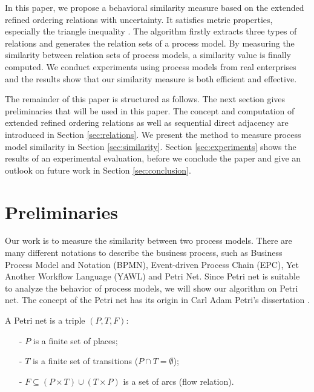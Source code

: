 \documentclass{llncs}
\begin{document}
In this paper, we propose a behavioral similarity measure based on the extended refined ordering relations with uncertainty. It satisfies metric properties, especially the triangle inequality \cite{zezula2006similarity}. The algorithm firstly extracts three types of relations and generates the relation sets of a process model. By measuring the similarity between relation sets of process models, a similarity value is finally computed. We conduct experiments using process models from real enterprises and the results show that our similarity measure is both efficient and effective.

The remainder of this paper is structured as follows. The next section gives preliminaries that will be used in this paper. The concept and computation of extended refined ordering relations as well as sequential direct adjacency are introduced in Section \ref{sec:relations}. We present the method to measure process model similarity in Section \ref{sec:similarity}. Section \ref{sec:experiments} shows the results of an experimental evaluation, before we conclude the paper and give an outlook on future work in Section \ref{sec:conclusion}.

\section{Preliminaries}\label{sec:preliminaries}
Our work is to measure the similarity between two process models. There are many different notations to describe the business process, such as Business Process Model and Notation (BPMN), Event-driven Process Chain (EPC), Yet Another Workflow Language (YAWL) and Petri Net. Since Petri net is suitable to analyze the behavior of process models, we will show our algorithm on Petri net. The concept of the Petri net has its origin in Carl Adam Petri's dissertation \cite{petri1966kommunikation}.

\begin{definition}\label{def:petrinet}
A Petri net is a triple $(P,T,F)$:
	\begin{itemize}
		\item[-] $P$ is a finite set of places;
		\item[-] $T$ is a finite set of transitions ($P\cap T=\emptyset$);
		\item[-] $F\subseteq(P\times T)\cup(T\times P)$ is a set of arcs (flow relation).
	\end{itemize}
\end{definition}
\end{document}
